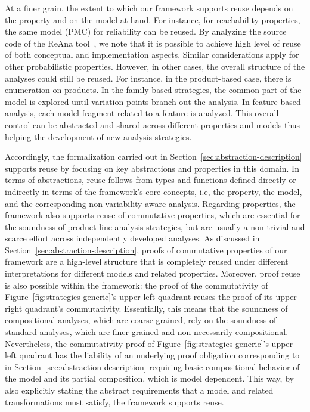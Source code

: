 At a finer grain, the extent to which our framework supports reuse depends on the property and on the model at hand. For instance, for reachability properties, the same model (PMC) for reliability can be reused. By analyzing the source code of the ReAna tool~\cite{LANNA2017}, we note that it is possible to achieve high level of reuse of both conceptual and implementation aspects. Similar considerations apply for other probabilistic properties. However, in other cases, the overall structure of the analyses could still be reused. For instance, in the product-based case, there is enumeration on products. In the family-based strategies, the common part of the model is explored until variation points branch out the analysis. In feature-based analysis, each model fragment related to a feature is analyzed. This overall control can be abstracted and shared across different properties and models thus helping the development of new analysis strategies.

Accordingly, the formalization carried out in Section~\ref{sec:abstraction-description} supports reuse by focusing on key abstractions and properties in this domain. 
In terms of abstractions, reuse follows from types and functions defined directly or indirectly in terms of the framework's core concepts, i.e, the property, the model, and the corresponding non-variability-aware analysis.
Regarding properties, the framework  also supports reuse of commutative properties, which are essential for the soundness of product line analysis strategies, but are usually a non-trivial and scarce effort across independently developed analyses. As discussed in Section~\ref{sec:abstraction-description}, proofs of commutative properties of our framework are a high-level structure that is completely reused under different interpretations for different models and  related properties. Moreover, proof reuse is also possible within the framework: the proof of the commutativity of Figure~\ref{fig:strategies-generic}'s  upper-left quadrant  reuses the proof of its upper-right quadrant's  commutativity. Essentially, this means that the soundness of compositional analyses, which are coarse-grained, rely on the soundness of standard analyses, which are finer-grained and non-necessarily compositional. Nevertheless,  the commutativity proof of Figure~\ref{fig:strategies-generic}'s  upper-left quadrant has the liability of an underlying proof obligation corresponding to~ %
in Section~\ref{sec:abstraction-description} requiring basic compositional behavior of the model and its partial composition, which is model dependent. This way, by also explicitly stating the abstract requirements that a model and related transformations must satisfy, the framework supports reuse.

